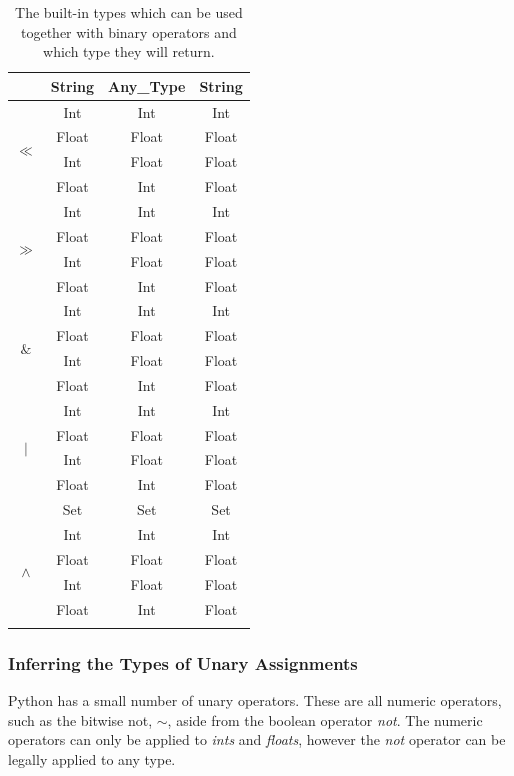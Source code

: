 \documentclass[12pt, titlepage]{article}
\begin{document}
\begin{longtable}{ |c |c |c |c | }
	                     & String & Any\_Type & String \\ \hline
	\multirow{4}{*}{$\ll$} & Int & Int & Int \\
	                     & Float & Float & Float \\
	                     & Int & Float & Float \\
	                     & Float & Int & Float \\ \hline 
	\multirow{4}{*}{$\gg$} & Int & Int & Int \\
	                     & Float & Float & Float \\
	                     & Int & Float & Float \\
	                     & Float & Int & Float \\ \hline
	\multirow{4}{*}{$\&$} & Int & Int & Int \\
	                     & Float & Float & Float \\
	                     & Int & Float & Float \\
	                     & Float & Int & Float \\ \hline
	\multirow{4}{*}{$|$} & Int & Int & Int \\
	                     & Float & Float & Float \\
	                     & Int & Float & Float \\
	                     & Float & Int & Float \\
	                     & Set & Set & Set \\
	\multirow{4}{*}{$\wedge$} & Int & Int & Int \\
	                     & Float & Float & Float \\
	                     & Int & Float & Float \\
	                     & Float & Int & Float \\ \hline     

    \caption{The built-in types which can be used together with binary operators and which type they will return.}
	\label{table:binaryOperators}
    \end{longtable}

\subsubsection{Inferring the Types of Unary Assignments}
Python has a small number of unary operators. These are all numeric operators, such as the bitwise not, $\sim$, aside from the boolean operator \textit{not}. The numeric operators can only be applied to \textit{ints} and \textit{floats}, however the \textit{not} operator can be legally applied to any type.
\end{document}
